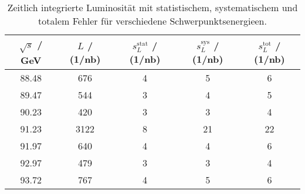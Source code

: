 \begin{table}[H]
\caption{Zeitlich integrierte Luminosität mit statistischem, systematischem und totalem Fehler für verschiedene Schwerpunktsenergieen.}
\begin{center}
\begin{tabular}{|c|c|c|c|c|}
  \hline
  $\sqrt{s}$ / GeV & $L$ / (1/nb) & $s_L^\text{stat}$ / (1/nb) & $s_L^\text{sys}$ / (1/nb) & $s_L^\text{tot}$ / (1/nb) \\ \hline
  88.48 & 676 & 4 & 5 & 6 \\ \hline
  89.47 & 544 & 3 & 4 & 5 \\ \hline
  90.23 & 420 & 3 & 3 & 4 \\ \hline
  91.23 & 3122 & 8 & 21 & 22 \\ \hline
  91.97 & 640 & 4 & 4 & 6 \\ \hline
  92.97 & 479 & 3 & 3 & 4 \\ \hline
  93.72 & 767 & 4 & 5 & 6 \\ \hline
\end{tabular}
\end{center}
\label{tab:lums}
\end{table}
